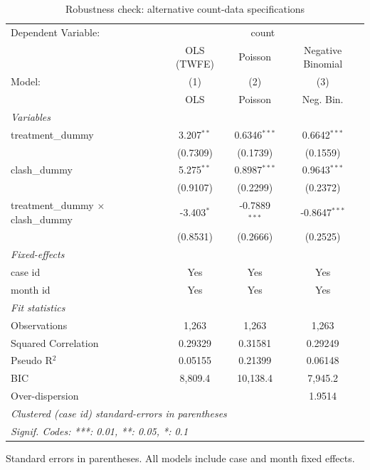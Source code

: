 \begin{table}[htbp]
   \caption{\label{tab:robustness_twfe_cl} Robustness check: alternative count-data specifications}
   \centering
   \begin{tabular}{lccc}
      \tabularnewline \midrule \midrule
      Dependent Variable: & \multicolumn{3}{c}{count}\\
                                                & OLS (TWFE)   & Poisson         & Negative Binomial \\   
      Model:                                    & (1)          & (2)             & (3)\\  
                                                &  OLS         & Poisson         & Neg. Bin.\\  
      \midrule
      \emph{Variables}\\
      treatment\_dummy                          & 3.207$^{**}$ & 0.6346$^{***}$  & 0.6642$^{***}$\\   
                                                & (0.7309)     & (0.1739)        & (0.1559)\\   
      clash\_dummy                              & 5.275$^{**}$ & 0.8987$^{***}$  & 0.9643$^{***}$\\   
                                                & (0.9107)     & (0.2299)        & (0.2372)\\   
      treatment\_dummy $\times$ clash\_dummy    & -3.403$^{*}$ & -0.7889$^{***}$ & -0.8647$^{***}$\\   
                                                & (0.8531)     & (0.2666)        & (0.2525)\\   
      \midrule
      \emph{Fixed-effects}\\
      case id                                  & Yes          & Yes             & Yes\\  
      month id                                 & Yes          & Yes             & Yes\\  
      \midrule
      \emph{Fit statistics}\\
      Observations                              & 1,263        & 1,263           & 1,263\\  
      Squared Correlation                       & 0.29329      & 0.31581         & 0.29249\\  
      Pseudo R$^2$                              & 0.05155      & 0.21399         & 0.06148\\  
      BIC                                       & 8,809.4      & 10,138.4        & 7,945.2\\  
      Over-dispersion                           &              &                 & 1.9514\\  
      \midrule \midrule
      \multicolumn{4}{l}{\emph{Clustered (case id) standard-errors in parentheses}}\\
      \multicolumn{4}{l}{\emph{Signif. Codes: ***: 0.01, **: 0.05, *: 0.1}}\\
   \end{tabular}
   
   \par \raggedright 
   Standard errors in parentheses. All models include case and month fixed effects.
\end{table}
